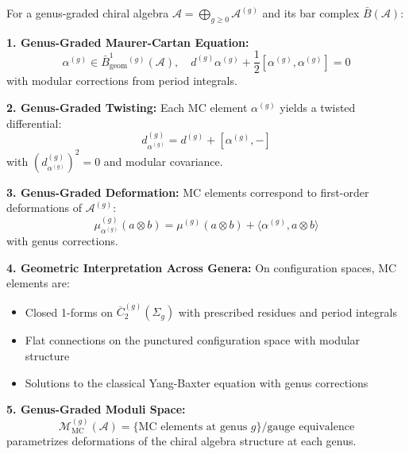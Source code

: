 \begin{theorem}
For a genus-graded chiral algebra $\mathcal{A} = \bigoplus_{g \geq 0} \mathcal{A}^{(g)}$ and its bar complex $\bar{B}(\mathcal{A})$:

\textbf{1. Genus-Graded Maurer-Cartan Equation:}
$$\alpha^{(g)} \in \bar{B}^1_{\text{geom}}^{(g)}(\mathcal{A}), \quad d^{(g)}\alpha^{(g)} + \frac{1}{2}[\alpha^{(g)}, \alpha^{(g)}] = 0$$
with modular corrections from period integrals.

\textbf{2. Genus-Graded Twisting:}
Each MC element $\alpha^{(g)}$ yields a twisted differential:
$$d_{\alpha^{(g)}}^{(g)} = d^{(g)} + [\alpha^{(g)}, -]$$
with $(d_{\alpha^{(g)}}^{(g)})^2 = 0$ and modular covariance.

\textbf{3. Genus-Graded Deformation:}
MC elements correspond to first-order deformations of $\mathcal{A}^{(g)}$:
$$\mu_{\alpha^{(g)}}^{(g)}(a \otimes b) = \mu^{(g)}(a \otimes b) + \langle \alpha^{(g)}, a \otimes b \rangle$$
with genus corrections.

\textbf{4. Geometric Interpretation Across Genera:}
On configuration spaces, MC elements are:
\begin{itemize}
\item Closed 1-forms on $\overline{C}_2^{(g)}(\Sigma_g)$ with prescribed residues and period integrals
\item Flat connections on the punctured configuration space with modular structure
\item Solutions to the classical Yang-Baxter equation with genus corrections
\end{itemize}

\textbf{5. Genus-Graded Moduli Space:}
$$\mathcal{M}_{\text{MC}}^{(g)}(\mathcal{A}) = \{\text{MC elements at genus } g\}/\text{gauge equivalence}$$
parametrizes deformations of the chiral algebra structure at each genus.
\end{theorem}
